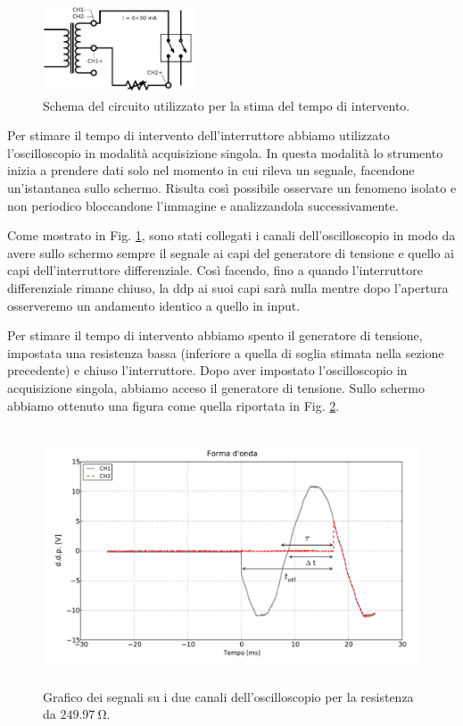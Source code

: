 \begin{figure}
	\centering
    \includegraphics[width=0.40\textwidth]{time.pdf}
    \caption{Schema del circuito utilizzato per la stima del tempo di intervento.}
    \label{fig:time}
\end{figure}

Per stimare il tempo di intervento dell'interruttore abbiamo utilizzato l'oscilloscopio in modalità acquisizione singola. In questa modalità lo strumento inizia a prendere dati solo nel momento in cui rileva un segnale, facendone un'istantanea sullo schermo. Risulta così possibile osservare un fenomeno isolato e non periodico bloccandone l'immagine e analizzandola successivamente.

Come mostrato in Fig. \ref{fig:time}, sono stati collegati i canali dell'oscilloscopio in modo da avere sullo schermo sempre il segnale ai capi del generatore di tensione e quello ai capi dell'interruttore differenziale. Così facendo, fino a quando l'interruttore differenziale rimane chiuso, la ddp ai suoi capi sarà nulla mentre dopo l'apertura osserveremo un andamento identico a quello in input.

Per stimare il tempo di intervento abbiamo spento il generatore di tensione, impostata una resistenza bassa (inferiore a quella di soglia stimata nella sezione precedente) e chiuso l'interruttore. Dopo aver impostato l'oscilloscopio in acquisizione singola, abbiamo acceso il generatore di tensione. Sullo schermo abbiamo ottenuto una figura come quella riportata in Fig. \ref{fig:graph}.

\begin{figure}[h]
	\centering
    \includegraphics[height=3in]{graph.pdf}
    \caption{Grafico dei segnali su i due canali dell'oscilloscopio per la resistenza da $\SI{249.97}{\ohm}$.}
    \label{fig:graph}
\end{figure}


